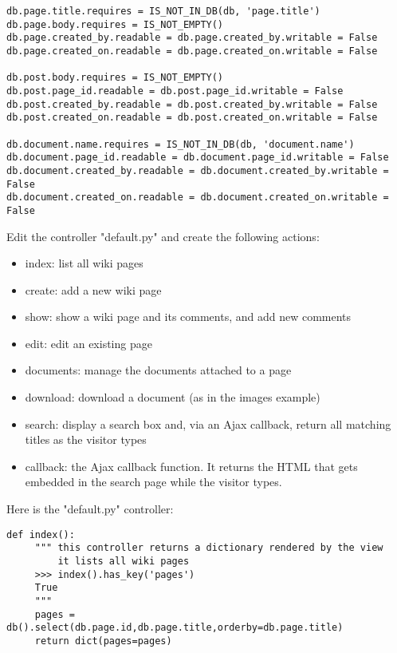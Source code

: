 \documentclass[justified,sixbynine,notoc]{tufte-book}
\begin{document}
\begin{fullwidth}
\begin{lstlisting}
db.page.title.requires = IS_NOT_IN_DB(db, 'page.title')
db.page.body.requires = IS_NOT_EMPTY()
db.page.created_by.readable = db.page.created_by.writable = False
db.page.created_on.readable = db.page.created_on.writable = False

db.post.body.requires = IS_NOT_EMPTY()
db.post.page_id.readable = db.post.page_id.writable = False
db.post.created_by.readable = db.post.created_by.writable = False
db.post.created_on.readable = db.post.created_on.writable = False

db.document.name.requires = IS_NOT_IN_DB(db, 'document.name')
db.document.page_id.readable = db.document.page_id.writable = False
db.document.created_by.readable = db.document.created_by.writable = False
db.document.created_on.readable = db.document.created_on.writable = False
\end{lstlisting}

Edit the controller "default.py" and create the following actions:
\begin{itemize}
\item index: list all wiki pages

\item create: add a new wiki page

\item show: show a wiki page and its comments, and add new comments

\item edit: edit an existing page

\item documents: manage the documents attached to a page

\item download: download a document (as in the images example)

\item search: display a search box and, via an Ajax callback, return all matching titles as the visitor types

\item callback: the Ajax callback function. It returns the HTML that gets embedded in the search page while the visitor types.
\end{itemize}

Here is the "default.py" controller:
\begin{lstlisting}
def index():
     """ this controller returns a dictionary rendered by the view
         it lists all wiki pages
     >>> index().has_key('pages')
     True
     """
     pages = db().select(db.page.id,db.page.title,orderby=db.page.title)
     return dict(pages=pages)


\end{lstlisting}
\end{fullwidth}
\end{document}
